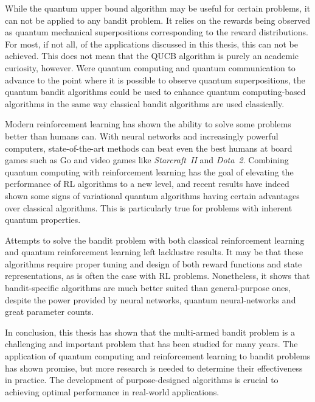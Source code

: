 While the quantum upper bound algorithm may be useful for certain problems, it can not be applied to any bandit problem.
It relies on the rewards being observed as quantum mechanical superpositions corresponding to the reward distributions.
For most, if not all, of the applications discussed in this thesis, this can not be achieved.
This does not mean that the QUCB algorithm is purely an academic curiosity, however.
Were quantum computing and quantum communication to advance to the point where it is possible to observe quantum superpositions, the quantum bandit algorithms could be used to enhance quantum computing-based algorithms in the same way classical bandit algorithms are used classically.

Modern reinforcement learning has shown the ability to solve some problems better than humans can.
With neural networks and increasingly powerful computers, state-of-the-art methods can beat even the best humans at board games such as Go and video games like \textit{Starcraft~II} and \textit{Dota~2}.
Combining quantum computing with reinforcement learning has the goal of elevating the performance of RL algorithms to a new level, and recent results have indeed shown some signs of variational quantum algorithms having certain advantages over classical algorithms.
This is particularly true for problems with inherent quantum properties.

Attempts to solve the bandit problem with both classical reinforcement learning and quantum reinforcement learning left lacklustre results.
It may be that these algorithms require proper tuning and design of both reward functions and state representations, as is often the case with RL problems.
Nonetheless, it shows that bandit-specific algorithms are much better suited than general-purpose ones, despite the power provided by neural networks, quantum neural-networks and great parameter counts.

In conclusion, this thesis has shown that the multi-armed bandit problem is a challenging and important problem that has been studied for many years. The application of quantum computing and reinforcement learning to bandit problems has shown promise, but more research is needed to determine their effectiveness in practice. The development of purpose-designed algorithms is crucial to achieving optimal performance in real-world applications.


